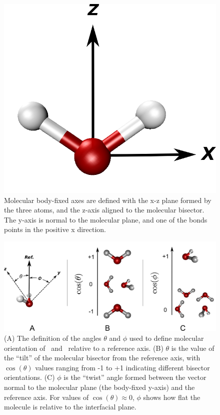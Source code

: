 \begin{figure}[h!]
	\begin{center}
		\includegraphics[scale=1.0]{images/angle-cartoons/molecularframesmall.png}
		\caption{Molecular body-fixed axes are defined with the x-z plane formed by the three atoms, and the z-axis aligned to the molecular bisector. The y-axis is normal to the molecular plane, and one of the bonds points in the positive x direction.}
		\label{fig:molecular-frame}
	\end{center}
\end{figure}

\begin{figure}[h!]
	\begin{center}
		\includegraphics[scale=1.0]{images/angle-cartoons/molecular-angles.png}
		\caption{(A) The definition of the angles $\theta$ and $\phi$ used to define molecular orientation of \suldiox~and \wat~relative to a reference axis. (B) $\theta$ is the value of the ``tilt'' of the molecular bisector from the reference axis, with $\cos(\theta)$ values ranging from -1 to +1 indicating different bisector orientations. (C) $\phi$ is the ``twist'' angle formed between the vector normal to the molecular plane (the body-fixed y-axis) and the reference axis. For values of $\cos(\theta) \approx 0$, $\phi$ shows how flat the molecule is relative to the interfacial plane.}
		\label{fig:water-angles}
	\end{center}
\end{figure}

